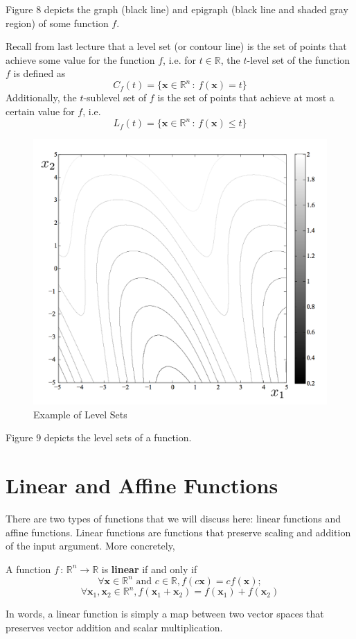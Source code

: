 \documentclass[12pt]{article}
\begin{document}
 \noindent Figure 8 depicts the graph (black line) and epigraph (black line and shaded gray region) of some function $f$. 
 

\noindent Recall from last lecture that a level set (or contour line) is the set of points that achieve some value for the function $f$, i.e. for $t\in\mathbb{R}$, the $t$-level set of the function $f$ is defined as $$C_f(t) = \{\mathbf{x}\in\mathbb{R}^n\,:\,f(\mathbf{x})=t\}$$ Additionally, the $t$-sublevel set of $f$ is the set of points that achieve at most a certain value for $f$, i.e. $$L_f(t) = \{\mathbf{x}\in\mathbb{R}^n\,:\, f(\mathbf{x})\leqslant t\}$$

  \begin{figure}[h!]\begin{center}\includegraphics[scale=0.4]{figures/levelsets}\caption{Example of Level Sets}\end{center}\end{figure}
  
 \noindent Figure 9 depicts the level sets of a function.

\section{Linear and Affine Functions}
There are two types of functions that we will discuss here: linear functions and affine functions. Linear functions are functions that preserve scaling and addition of the input argument. More concretely,
\begin{definition}
A function $f\,:\,\mathbb{R}^n\to\mathbb{R}$ is \textbf{linear} if and only if $$\forall \mathbf{x}\in\mathbb{R}^n\,\,\text{and}\,\, c\in\mathbb{R}, f(c\mathbf{x}) = cf(\mathbf{x});$$ $$\forall\mathbf{x}_1,\mathbf{x}_2\in\mathbb{R}^n, f(\mathbf{x}_1+\mathbf{x}_2) = f(\mathbf{x}_1) + f(\mathbf{x}_2)$$
\end{definition}
\noindent In words, a linear function is simply a map between two vector spaces that preserves vector addition and scalar multiplication.
\end{document}
